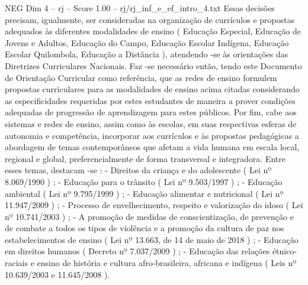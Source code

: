 \begin{textsample}{NEG Dim 4 – rj – Score 1.00 – rj/rj\_inf\_e\_ef\_intro\_4.txt}
Essas decisões precisam, igualmente, ser consideradas na organização de currículos e propostas adequados às diferentes modalidades de ensino ( Educação Especial, Educação de Jovens e Adultos, Educação do Campo, Educação Escolar Indígena, Educação Escolar Quilombola, Educação a Distância ), atendendo -se às orientações das Diretrizes Curriculares Nacionais.
Faz -se necessário então, tendo este Documento de Orientação Curricular como referência, que as redes de ensino formulem propostas curriculares para as modalidades de ensino acima citadas considerando as especificidades requeridas por estes estudantes de maneira a prover condições adequadas de progressão de aprendizagem para estes públicos.
Por fim, cabe aos sistemas e redes de ensino, assim como às escolas, em suas respectivas esferas de autonomia e competência, incorporar aos currículos e às propostas pedagógicas a abordagem de temas contemporâneos que afetam a vida humana em escala local, regional e global, preferencialmente de forma transversal e integradora.
Entre esses temas, destacam -se : - Direitos da criança e do adolescente ( Lei nº 8.069/1990 ) ; - Educação para o trânsito ( Lei nº 9.503/1997 ) ; - Educação ambiental ( Lei nº 9.795/1999 ) ; - Educação alimentar e nutricional ( Lei nº 11.947/2009 ) ; - Processo de envelhecimento, respeito e valorização do idoso ( Lei nº 10.741/2003 ) ; - A promoção de medidas de conscientização, de prevenção e de combate a todos os tipos de violência e a promoção da cultura de paz nos estabelecimentos de ensino ( Lei nº 13.663, de 14 de maio de 2018 ) ; - Educação em direitos humanos ( Decreto nº 7.037/2009 ) ; - Educação das relações étnico-raciais e ensino de história e cultura afro-brasileira, africana e indígena ( Leis nº 10.639/2003 e 11.645/2008 ).

\end{textsample}
